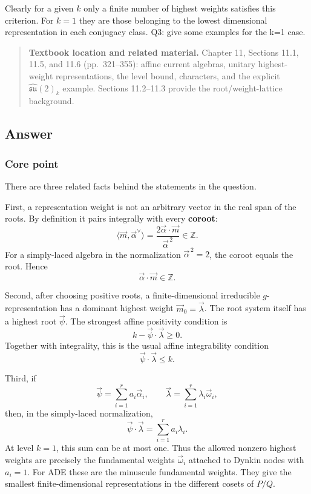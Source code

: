 \documentclass[
  10pt,
  a4paper,
  openany]{book}
\begin{document}
Clearly for a given \(k\) only a finite number of highest weights
satisfies this criterion. For \(k=1\) they are those belonging to the
lowest dimensional representation in each conjugacy class. Q3: give some
examples for the k=1 case.

\begin{quote}
\textbf{Textbook location and related material.} Chapter 11, Sections
11.1, 11.5, and 11.6 (pp.~321--355): affine current algebras, unitary
highest-weight representations, the level bound, characters, and the
explicit \(\widehat{\mathfrak{su}}(2)_k\) example. Sections 11.2--11.3
provide the root/weight-lattice background.
\end{quote}

\subsection{Answer}\label{answer-14}

\subsubsection{Core point}\label{core-point-14}

There are three related facts behind the statements in the question.

First, a representation weight is not an arbitrary vector in the real
span of the roots. By definition it pairs integrally with every
\textbf{coroot}: \[
\langle \vec m,\vec\alpha^{\vee}\rangle
=\frac{2\vec\alpha\cdot\vec m}{\vec\alpha^{\,2}}
\in\mathbb Z.
\] For a simply-laced algebra in the normalization
\(\vec\alpha^{\,2}=2\), the coroot equals the root. Hence \[
\vec\alpha\cdot\vec m\in\mathbb Z.
\]

Second, after choosing positive roots, a finite-dimensional irreducible
\(g\)-representation has a dominant highest weight
\(\vec m_0=\vec\lambda\). The root system itself has a highest root
\(\vec\psi\). The strongest affine positivity condition is \[
k-\vec\psi\cdot\vec\lambda\geq0.
\] Together with integrality, this is the usual affine integrability
condition \[
\vec\psi\cdot\vec\lambda\leq k.
\]

Third, if \[
\vec\psi=\sum_{i=1}^r a_i\vec\alpha_i,
\qquad
\vec\lambda=\sum_{i=1}^r\lambda_i\vec\omega_i,
\] then, in the simply-laced normalization, \[
\vec\psi\cdot\vec\lambda=\sum_{i=1}^r a_i\lambda_i.
\] At level \(k=1\), this sum can be at most one. Thus the allowed
nonzero highest weights are precisely the fundamental weights
\(\vec\omega_i\) attached to Dynkin nodes with \(a_i=1\). For ADE these
are the minuscule fundamental weights. They give the smallest
finite-dimensional representations in the different cosets of \(P/Q\).
\end{document}
